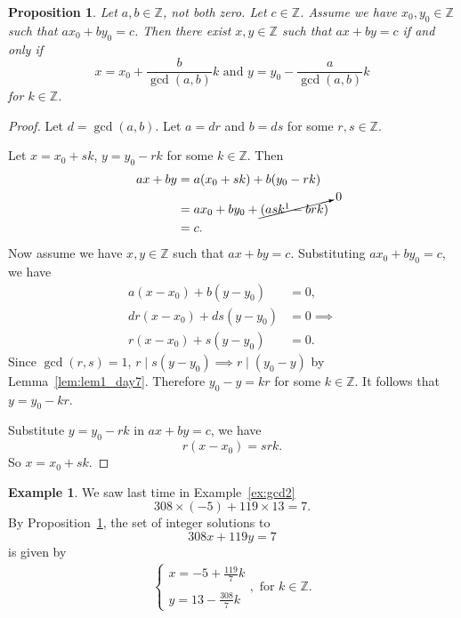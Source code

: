 \documentclass{amsbook}
\theoremstyle{plain}
\newtheorem{proposition}[theorem]{Proposition}
\theoremstyle{definition}
\newtheorem{example}[theorem]{Example}
\theoremstyle{remark}
\numberwithin{equation}{chapter}
\numberwithin{figure}{chapter}
\newcommand{\Z}{\mathbb{Z}}
\begin{document}
\begin{proposition}\label{prop:lin_diophantine}
Let $a, b \in \Z$, not both zero. Let $c \in \Z$. Assume we have $x_0, y_0 \in \Z$ such that $ax_0 + by_0 = c$. Then there exist $x, y \in \Z$ such that $ax + by = c$ if and only if 
\[
x = x_0 + \frac{b}{\gcd (a, b)}k \text{ and } y = y_0 - \frac{a}{\gcd (a, b)}k
\] 
for $k \in \Z$.
\end{proposition}
\begin{proof}
Let $d = \gcd (a, b)$. Let $a = dr$ and $b = ds$ for some $r, s \in \Z$.

Let $x = x_0 + sk$, $y = y_0 - rk$ for some $k \in \Z$. Then 
\begin{align}
ax + by &= a(x_0 + sk) + b(y_0 - rk) \\
        &= ax_0 + by_0 + \cancelto{0}{(ask\footnotemark - brk)} \\
        & = c.
\end{align}
Now assume we have $x, y \in \Z$ such that $ax + by = c$. Substituting $ax_0 + by_0 = c$, we have 
\begin{align}
  a(x - x_0) + b(y - y_0) &= 0, \\
  dr(x - x_0) + ds(y - y_0) &= 0 \implies \\
  r(x - x_0) + s(y - y_0) &= 0.
\end{align}
Since $\gcd (r, s) = 1$, $r \mid s(y - y_0) \implies r \mid (y_0 - y)$ by Lemma~\ref{lem:lem1_day7}. Therefore $y_0 - y = kr$ for some $k \in \Z$. It follows that $y = y_0 - kr$.

Substitute $y = y_0 - rk$ in $ax + by = c$, we have
\[
r(x - x_0) = srk.
\]
So $x = x_0 + sk$.
\end{proof}

\begin{example}
We saw last time in Example~\ref{ex:gcd2}
\[
308 \times (-5) + 119 \times 13 = 7.
\]
By Proposition~\ref{prop:lin_diophantine}, the set of integer solutions to 
\[
308 x + 119 y = 7
\] 
is given by 
\begin{align}
\left\{ \begin{array}{l} 
          x = -5 + \displaystyle \frac{119}7 k \\
          \\ %
          y = 13 - \displaystyle \frac{308}7 k
          \end{array}\right. , \text{ for } k \in \Z.
\end{align}
\end{example}
\end{document}

